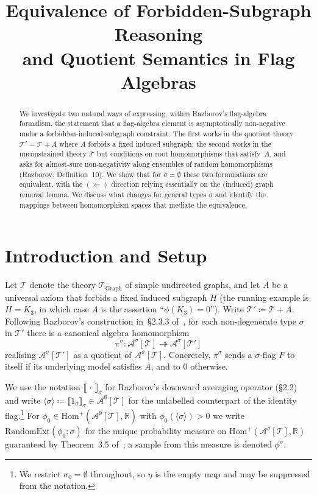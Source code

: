 \documentclass[11pt]{article}
\title{Equivalence of Forbidden-Subgraph Reasoning\\
       and Quotient Semantics in Flag Algebras}
\author{}
\date{}
\theoremstyle{definition}
\newcommand{\R}{\mathbb{R}}
\newcommand{\A}{\mathcal{A}}
\newcommand{\T}{\mathcal{T}}
\newcommand{\Homp}{\mathrm{Hom}^{+}}
\newcommand{\RandomExt}{\mathrm{RandomExt}}
\newcommand{\avg}[2]{\llbracket #1 \rrbracket_{#2}}
\begin{document}
\maketitle

\begin{abstract}
We investigate two natural ways of expressing, within Razborov's flag-algebra
formalism, the statement that a flag-algebra element is asymptotically
non-negative under a forbidden-induced-subgraph constraint. The first works in the
quotient theory $\T' = \T + A$ where $A$ forbids a fixed induced subgraph; the
second works in the unconstrained theory $\T$ but conditions on root
homomorphisms that satisfy~$A$, and asks for almost-sure non-negativity along
ensembles of random homomorphisms (Razborov, Definition~10). We show that for
$\sigma = \emptyset$ these two formulations are equivalent, with the
$(\Leftarrow)$ direction relying essentially on the (induced) graph removal
lemma. We discuss what changes for general types $\sigma$ and identify the
mappings between homomorphism spaces that mediate the equivalence.
\end{abstract}

\section{Introduction and Setup}

Let $\T$ denote the theory $\T_{\mathrm{Graph}}$ of simple undirected graphs, and
let $A$ be a universal axiom that forbids a fixed induced subgraph $H$ (the
running example is $H = K_3$, in which case $A$ is the assertion
``$\phi(K_3) = 0$''). Write $\T' \coloneqq \T + A$. Following Razborov's
construction in~\S2.3.3 of~\cite{Razborov2007}, for each non-degenerate type
$\sigma$ in $\T'$ there is a canonical algebra homomorphism
\[
  \pi^{\sigma} \colon \A^{\sigma}[\T] \twoheadrightarrow \A^{\sigma}[\T']
\]
realising $\A^{\sigma}[\T']$ as a quotient of $\A^{\sigma}[\T]$. Concretely,
$\pi^{\sigma}$ sends a $\sigma$-flag $F$ to itself if its underlying model
satisfies $A$, and to $0$ otherwise.

We use the notation $\avg{\,\cdot\,}{\sigma}$ for Razborov's downward
averaging operator (\S2.2) and write $\langle \sigma \rangle \coloneqq
\avg{1_{\sigma}}{\sigma} \in \A^{\emptyset}[\T]$ for the unlabelled
counterpart of the identity flag.\footnote{We restrict $\sigma_0 = \emptyset$
throughout, so $\eta$ is the empty map and may be suppressed from the
notation.} For $\phi_0 \in \Homp(\A^{\emptyset}[\T], \R)$ with
$\phi_0(\langle \sigma \rangle) > 0$ we write $\RandomExt(\phi_0; \sigma)$ for
the unique probability measure on $\Homp(\A^{\sigma}[\T], \R)$ guaranteed by
Theorem~3.5 of~\cite{Razborov2007}; a sample from this measure is denoted
$\phi^{\sigma}$.
\end{document}
